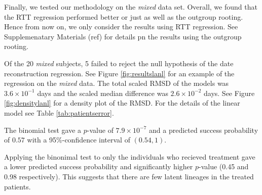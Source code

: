 \documentclass[12pt]{article}
\begin{document}



Finally, we tested our methodology on the {\em mixed} data set.
Overall, we found that the RTT regression performed better or just as well as the outgroup rooting.
Hence from now on, we only consider the results using RTT regression.
See Supplemenatary Materials (ref) for details pn the results using the outgroup rooting.

Of the 20 \emph{mixed} subjects, 5 failed to reject the null hypothesis of the date reconstruction regression.
See Figure \ref{fig:resultslanl} for an example of the regression on the \emph{mixed} data.
The total scaled RMSD of the models was $3.6 \times 10^{-1}$ days and the scaled median difference was $2.6 \times 10^{-2}$ days.
See Figure \ref{fig:densitylanl} for a density plot of the RMSD.
For the details of the linear model see Table \ref{tab:patientserror}.

The binomial test gave a $p$-value of $7.9 \times 10^{-7}$ and a predicted success probability of $0.57$ with a 95\%-confidence interval of $(0.54, 1)$.

Applying the binonimal test to only the individuals who recieved treatment gave a lower predicted success probability and significantly higher $p$-value (0.45 and 0.98 respectively). This suggests that there are few latent lineages in the treated patients.

\end{document}
